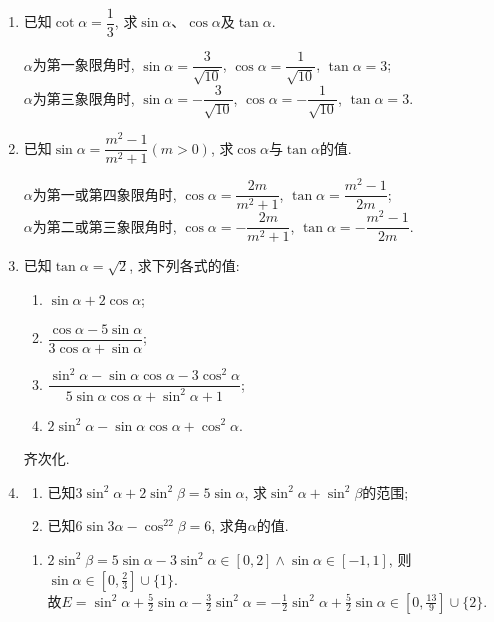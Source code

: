 \begin{enumerate}
\item 已知$\cot\alpha=\dfrac{1}{3}$, 求$\sin\alpha$、$\cos\alpha$及$\tan\alpha$. 
\begin{jieda}
$\alpha$为第一象限角时, $\sin\alpha=\dfrac{3}{\sqrt{10}}$, $\cos\alpha=\dfrac{1}{\sqrt{10}}$, $\tan\alpha=3$; \\
$\alpha$为第三象限角时, $\sin\alpha=-\dfrac{3}{\sqrt{10}}$, $\cos\alpha=-\dfrac{1}{\sqrt{10}}$, $\tan\alpha=3$. 
\end{jieda}

\item 已知$\sin\alpha=\dfrac{m^2-1}{m^2+1}\left(m>0\right)$, 求$\cos\alpha$与$\tan\alpha$的值. 
\begin{jieda}
$\alpha$为第一或第四象限角时, $\cos\alpha=\dfrac{2m}{m^2+1}$, $\tan\alpha=\dfrac{m^2-1}{2m}$; \\
$\alpha$为第二或第三象限角时, $\cos\alpha=-\dfrac{2m}{m^2+1}$, $\tan\alpha=-\dfrac{m^2-1}{2m}$. 
\end{jieda}



\item 已知$\tan\alpha=\sqrt{2}$, 求下列各式的值:
\begin{enumerate}[(1)]
\item $\sin\alpha+2\cos\alpha$; 
\item $\dfrac{\cos\alpha-5\sin\alpha}{3\cos\alpha+\sin\alpha}$; 
\item $\dfrac{\sin^2\alpha-\sin\alpha\cos\alpha-3\cos^2\alpha}{5\sin\alpha\cos\alpha+\sin^2\alpha+1}$; 
\item $2\sin^2\alpha-\sin\alpha\cos\alpha+\cos^2\alpha$. 
\end{enumerate}
\begin{jieda}
齐次化. \\
\end{jieda}



\item
\begin{enumerate}
\item 已知$3\sin^2\alpha+2\sin^2\beta=5\sin\alpha$, 求$\sin^2\alpha+\sin^2\beta$的范围; 
\item 已知$6\sin3\alpha-\cos^22\beta=6$, 求角$\alpha$的值. 
\end{enumerate}
\begin{jieda}
\begin{enumerate}
\item $2\sin^2\beta=5\sin\alpha-3\sin^2\alpha\in[0,2]\land\sin\alpha\in[-1,1]$, 则$\sin\alpha\in[0,\frac{2}{3}]\cup\{1\}$. \\
故$E=\sin^2\alpha+\frac{5}{2}\sin\alpha-\frac{3}{2}\sin^2\alpha=-\frac{1}{2}\sin^2\alpha+\frac{5}{2}\sin\alpha\in[0,\frac{13}{9}]\cup\{2\}$. 


\end{enumerate}
\end{jieda}
\end{enumerate}
